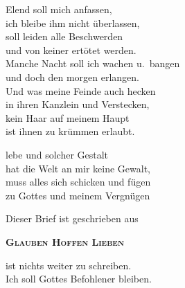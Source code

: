 \documentclass[
  paper=a3,
  fontsize=20pt,
  parskip=half,
  twocolumn,
  DIV=16,
]{scrartcl}
\newcommand{\glaubenhoffenlieben}{%
  \centerline{Dieser Brief ist geschrieben aus}
  \centerline{\serif \textbf{\textsc{Glauben Hoffen Lieben}}}%
}
\begin{document}
 Elend soll mich anfassen, \\
ich bleibe ihm nicht überlassen, \\
soll leiden alle Beschwerden \\
und von keiner ertötet werden. \\
Manche Nacht  soll ich wachen u.\ bangen \\
und doch den morgen erlangen. \\
Und was meine Feinde auch hecken  \\
in ihren Kanzlein und Verstecken, \\
kein Haar auf meinem Haupt \\
ist ihnen zu krümmen erlaubt.

 lebe und solcher Gestalt \\
hat die Welt an mir keine Gewalt, \\
muss alles sich schicken und fügen \\
zu Gottes und meinem Vergnügen

\vspace{1em}
\glaubenhoffenlieben

\initialEs ist nichts weiter zu schreiben. \\
Ich soll Gottes Befohlener bleiben.%
\end{document}
